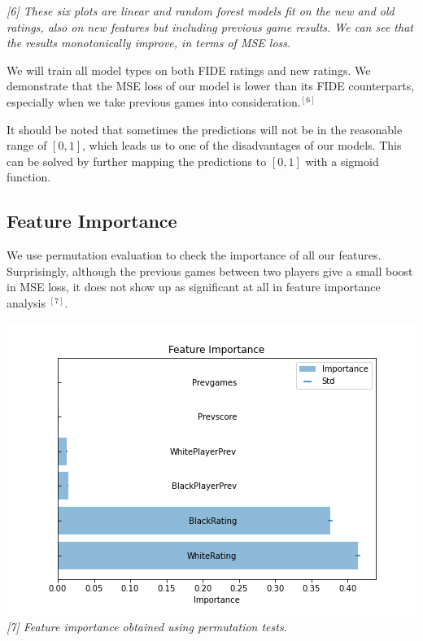 \documentclass[12pt, letterpaper]{article}
\begin{document}
\begin{scriptsize}
\textit{[6] These six plots are linear and random forest models fit on the new and old ratings, also on new features but including previous game results. We can see that the results monotonically improve, in terms of MSE loss.}

\end{scriptsize}

\setlength{\parskip}{0.1cm}

\begin{multicols}{2}

We will train all model types on both FIDE ratings and new ratings. We demonstrate that the MSE loss of our model is lower than its FIDE counterparts, especially when we take previous games into consideration.$^{[6]}$

It should be noted that sometimes the predictions will not be in the reasonable range of $[0, 1]$, which leads us to one of the disadvantages of our models. This can be solved by further mapping the predictions to $[0, 1]$ with a sigmoid function.

\subsection*{Feature Importance}

We use permutation evaluation to check the importance of all our features. Surprisingly, although the previous games between two players give a small boost in MSE loss, it does not show up as significant at all in feature importance analysis $^{[7]}$.

\setlength{\parskip}{0.0cm}
\begin{center}
\begin{scriptsize}

\includegraphics[width=\linewidth]{../figures/feature_importance.png}
\textit{[7] Feature importance obtained using permutation tests.}


\end{scriptsize}
\end{center}
\end{multicols}
\end{document}
